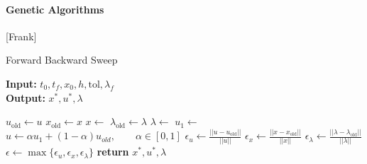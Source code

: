 \paragraph{Genetic Algorithms}
[Frank]
\begin{algorithm}
  \caption{Forward Backward Sweep } \label{alg:forward_backward_sweep}
  \begin{flushleft}
    \hspace*{\algorithmicindent} \textbf{Input:} 
    $t_0, t_f, x_0,h, \text{tol}, \lambda_{f}$ \\
    \hspace*{\algorithmicindent} \textbf{Output:} 
    $x^*, u^*, \lambda$
  \end{flushleft}
  \begin{algorithmic}
      \State $u_{\text{old}} \gets u$ 
      \State $x_{\text{old}} \gets x$ 
      \State $ x \gets$
      \State $\lambda_{\text{old}} \gets \lambda $
      \State $\lambda \gets$ 
      \State $u_1 \gets$ 
      \State 
        $u \gets \alpha u_1 + (1-\alpha)u_{old}, 
        \qquad \alpha \in [0, 1]$
      \State 
      $\epsilon_u \gets \displaystyle 
        \frac{||u - u_{\text{old}}||}{||u||}$
      \State 
      $\epsilon_x \gets \displaystyle 
        \frac{||x - x_{\text{old}}||}{||x||}$
      \State 
        $\epsilon_{\lambda} \gets \displaystyle 
        \frac{||\lambda - \lambda_{\text{old}}||}{||\lambda||}$
      \State 
        $\epsilon \gets 
        \max{ 
          \{ \epsilon_u, \epsilon_x, \epsilon_{\lambda} \}
       }$
    \EndWhile\label{}
      \State \textbf{return} $ x^*, u^*, \lambda$
    \EndProcedure
  \end{algorithmic}
\end{algorithm}

